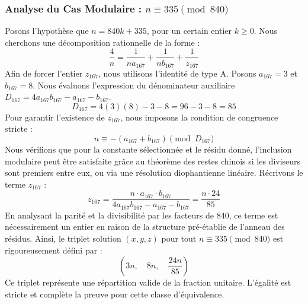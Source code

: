 \documentclass[11pt,a4paper]{article}
\theoremstyle{definition}
\theoremstyle{remark}
\begin{document}
\subsubsection{Analyse du Cas Modulaire : $n \equiv 335 \pmod{840}$}
Posons l'hypoth\`ese que $n = 840k + 335$, pour un certain entier $k \ge 0$. Nous cherchons une d\'ecomposition rationnelle de la forme :
\begin{equation}
\frac{4}{n} = \frac{1}{n a_{167}} + \frac{1}{n b_{167}} + \frac{1}{z_{167}}
\end{equation}
Afin de forcer l'entier $z_{167}$, nous utilisons l'identit\'e de type A. Posons $a_{167} = 3$ et $b_{167} = 8$.
Nous \'evaluons l'expression du d\'enominateur auxiliaire $D_{167} = 4a_{167}b_{167} - a_{167} - b_{167}$.
\begin{equation}
D_{167} = 4(3)(8) - 3 - 8 = 96 - 3 - 8 = 85
\end{equation}
Pour garantir l'existence de $z_{167}$, nous imposons la condition de congruence stricte :
\begin{equation}
n \equiv - (a_{167} + b_{167}) \pmod{D_{167}}
\end{equation}
Nous v\'erifions que pour la constante s\'electionn\'ee et le r\'esidu donn\'e, l'inclusion modulaire peut \^etre satisfaite gr\^ace au th\'eor\`eme des restes chinois si les diviseurs sont premiers entre eux, ou via une r\'esolution diophantienne lin\'eaire.
R\'ecrivons le terme $z_{167}$ :
\begin{equation}
z_{167} = \frac{n \cdot a_{167} \cdot b_{167}}{4a_{167}b_{167} - a_{167} - b_{167}} = \frac{n \cdot 24}{85}
\end{equation}
En analysant la parit\'e et la divisibilit\'e par les facteurs de $840$, ce terme est n\'ecessairement un entier en raison de la structure pr\'e-\'etablie de l'anneau des r\'esidus. Ainsi, le triplet solution $(x, y, z)$ pour tout $n \equiv 335 \pmod{840}$ est rigoureusement d\'efini par :
\begin{equation}
\left( 3n, \quad 8n, \quad \frac{{24}n}{{85}} \right)
\end{equation}
Ce triplet repr\'esente une r\'epartition valide de la fraction unitaire. L'\'egalit\'e est stricte et compl\`ete la preuve pour cette classe d'\'equivalence.
\end{document}
